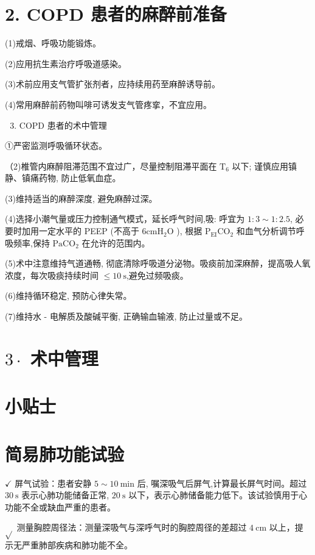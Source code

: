 \documentclass[10pt]{article}
\begin{document}
\section*{2. COPD 患者的麻醉前准备}
(1)戒烟、呼吸功能锻炼。

(2)应用抗生素治疗呼吸道感染。

(3)术前应用支气管扩张剂者，应持续用药至麻醉诱导前。

(4)常用麻醉前药物叫啡可诱发支气管疼挛，不宜应用。

\begin{enumerate}
  \setcounter{enumi}{2}
  \item COPD 患者的术中管理
\end{enumerate}

①严密监测呼吸循环状态。

（2)椎管内麻醉阻滞范围不宜过广，尽量控制阻滞平面在 $\mathrm{T}_{6}$ 以下; 谨慎应用镇静、镇痛药物, 防止低氧血症。

(3)维持适当的麻醉深度, 避免麻醉过深。

(4)选择小潮气量或压力控制通气模式，延长呼气时间,吸: 呼宜为 $1: 3 \sim 1: 2.5$, 必要时加用一定水平的 PEEP (不高于 $6 \mathrm{cmH}_{2} \mathrm{O}$ ), 根据 $\mathrm{P}_{\mathrm{EI}} \mathrm{CO}_{2}$ 和血气分析调节呼吸频率,保持 $\mathrm{PaCO}_{2}$ 在允许的范围内。

(5)术中注意维持气道通畅, 彻底清除呼吸道分泌物。吸痰前加深麻醉，提高吸人氧浓度，每次吸痰持续时间 $\leqslant 10 \mathrm{~s}$,避免过频吸痰。

(6)维持循环稳定, 预防心律失常。

(7)维持水 - 电解质及酸碱平衡, 正确输血输液, 防止过量或不足。

\section*{$3 \cdot$ 术中管理}
\section*{小贴士}
\section*{简易肺功能试验}
$\checkmark$ 屏气试验：患者安静 $5 \sim 10 \mathrm{~min}$ 后, 嘱深吸气后屏气,计算最长屏气时间。超过 $30 \mathrm{~s}$ 表示心肺功能储备正常, $20 \mathrm{~s}$ 以下，表示心肺储备能力低下。该试验慎用于心功能不全或缺血严重的患者。

$\sqrt{ }$ 测量胸腔周径法：测量深吸气与深呼气时的胸腔周径的差超过 $4 \mathrm{~cm}$ 以上，提示无严重肺部疾病和肺功能不全。
\end{document}
